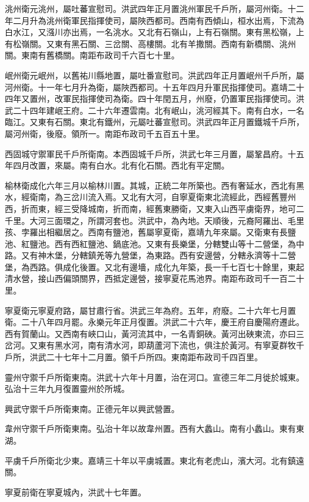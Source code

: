 洮州衛元洮州，屬吐蕃宣慰司。洪武四年正月置洮州軍民千戶所，屬河州衛。十二年二月升為洮州衛軍民指揮使司，屬陜西都司。西南有西傾山，桓水出焉，下流為白水江，又漒川亦出焉，一名洮水。又北有石嶺山，上有石嶺關。東有黑松嶺，上有松嶺關。又東有黑石關、三岔關、高樓關。北有羊撒關。西南有新橋關、洮州關。東南有舊橋關。南距布政司千六百七十里。

岷州衛元岷州，以舊祐川縣地置，屬吐番宣慰司。洪武四年正月置岷州千戶所，屬河州衛。十一年七月升為衛，屬陜西都司。十五年四月升軍民指揮使司。嘉靖二十四年又置州，改軍民指揮使司為衛。四十年閏五月，州廢，仍置軍民指揮使司。洪武二十四年建岷王府。二十六年遷雲南。北有岷山，洮河經其下。南有白水，一名臨江。又東有石關。東北有鐵州，元屬吐蕃宣慰司。洪武四年正月置鐵城千戶所，屬河州衛，後廢。領所一。南距布政司千五百五十里。

西固城守禦軍民千戶所衛南。本西固城千戶所，洪武七年三月置，屬鞏昌府。十五年四月改置，來屬。南有白水。北有化石關。西北有平定關。

榆林衛成化六年三月以榆林川置。其城，正統二年所築也。西有奢延水，西北有黑水，經衛南，為三岔川流入焉。又北有大河，自寧夏衛東北流經此，西經舊豐州西，折而東，經三受降城南，折而南，經舊東勝衛，又東入山西平虜衛界，地可二千里。大河三面環之，所謂河套也。洪武中，為內地。天順後，元裔阿羅出、毛里孩、孛羅出相繼居之。西南有鹽池，舊屬寧夏衛，嘉靖九年來屬。又衛東有長鹽池、紅鹽池。西有西紅鹽池、鍋底池。又東有長樂堡，分轄雙山等十二營堡，為中路。又有神木堡，分轄鎮羌等九營堡，為東路。西有安邊營，分轄永濟等十二營堡，為西路。俱成化後置。又北有邊墻，成化九年築，長一千七百七十餘里，東起清水營，接山西偏頭關界，西抵定邊營，接寧夏花馬池界。南距布政司千一百二十里。

寧夏衛元寧夏府路，屬甘肅行省。洪武三年為府。五年，府廢。二十六年七月置衛。二十八年四月罷。永樂元年正月復置。洪武二十六年，慶王府自慶陽府遷此。西有賀蘭山。又西南有峽口山，黃河流其中，一名青銅硤。黃河出硤東流，亦曰三岔河。又東有黑水河，南有清水河，即葫蘆河下流也，俱注於黃河。有寧夏群牧千戶所，洪武二十七年十二月置。領千戶所四。東南距布政司千四百里。

靈州守禦千戶所衛東南。洪武十六年十月置，治在河口。宣德三年二月徙於城東。弘治十三年九月復置靈州於所城。

興武守禦千戶所衛東南。正德元年以興武營置。

韋州守禦千戶所衛東南。弘治十年以故韋州置。西有大蠡山。南有小蠡山。東有東湖。

平虜千戶所衛北少東。嘉靖三十年以平虜城置。東北有老虎山，濱大河。北有鎮遠關。

寧夏前衛在寧夏城內，洪武十七年置。

